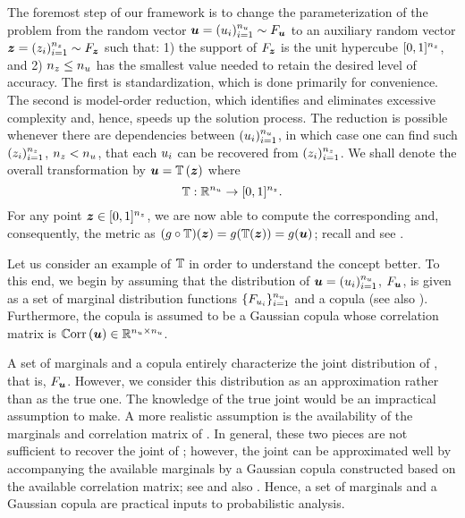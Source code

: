 The foremost step of our framework is to change the parameterization of the
problem from the random vector $\boldsymbol{u} = (u_i)_{i = 1}^{n_{u}} \sim F_{\boldsymbol{u}}$ to an
auxiliary random vector $\boldsymbol{z} = (z_i)_{i = 1}^{n_{z}} \sim F_{\boldsymbol{z}}$ such that: 1)
the support of $F_{\boldsymbol{z}}$ is the unit hypercube $[0, 1]^{n_{z}}$, and 2) ${n_{z}} \leq
{n_{u}}$ has the smallest value needed to retain the desired level of accuracy. The
first is standardization, which is done primarily for convenience. The second is
model-order reduction, which identifies and eliminates excessive complexity and,
hence, speeds up the solution process. The reduction is possible whenever there
are dependencies between $(u_i)_{i = 1}^{n_{u}}$, in which case one can find such
$(z_i)_{i = 1}^{n_{z}}$, ${n_{z}} < {n_{u}}$, that each $u_i$ can be recovered from
$(z_i)_{i = 1}^{n_{z}}$. We shall denote the overall transformation by $\vu =
\transform{\vz}$ where
\[
  \transform: \real^\nu \to [0, 1]^\nz.
\]
For any point $\boldsymbol{z} \in [0, 1]^{n_{z}}$, we are now able to compute the corresponding
\vu and, consequently, the metric \g as $(\g \circ \transform)(\vz) =
\g(\transform(\vz)) = \g(\vu)$; recall  and see .

Let us consider an example of $\transform$ in order to understand the concept
better. To this end, we begin by assuming that the distribution of $\boldsymbol{u} =
(u_i)_{i = 1}^{n_{u}}$, $F_{\boldsymbol{u}}$, is given as a set of marginal distribution
functions $\{ F_{u_i} \}_{i = 1}^{n_{u}}$ and a copula \cite{nelsen2006} (see also
). Furthermore, the copula is assumed to be a Gaussian
copula whose correlation matrix is $\correlation{\vu} \in \real^{\nu \times
\nu}$.

\begin{remark}
A set of marginals and a copula entirely characterize the joint distribution of
\vu, that is, $F_{\boldsymbol{u}}$. However, we consider this distribution as an
approximation rather than as the true one. The knowledge of the true joint would
be an impractical assumption to make. A more realistic assumption is the
availability of the marginals and correlation matrix of \vu. In general, these
two pieces are not sufficient to recover the joint of \vu; however, the joint
can be approximated well by accompanying the available marginals by a Gaussian
copula constructed based on the available correlation matrix; see \cite{liu1986}
and also \cite{ukhov2014}. Hence, a set of marginals and a Gaussian copula are
practical inputs to probabilistic analysis.
\end{remark}

